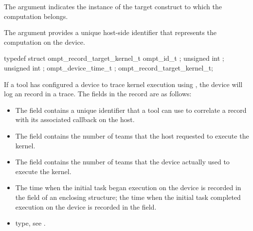 \constraints

The argument  indicates the instance of the
target construct to which the computation belongs.

The argument  provides a unique host-side
identifier that represents the computation on the device.

\record

\begin{ccppspecific}
\begin{omptRecord}
typedef struct ompt_record_target_kernel_t {
  ompt_id_t ;
  unsigned int ;
  unsigned int ;
  ompt_device_time_t ;
} ompt_record_target_kernel_t;
\end{omptRecord}
\end{ccppspecific}



If a tool has configured a device to trace kernel execution using ,
the device will log an  record in a trace. The fields 
in the record
are as follows:

\begin{itemize}
\item The  field contains a unique identifier that a tool can use to correlate a
 record with its associated  callback
on the host.

\item The  field contains the number of teams that the host requested to execute the kernel.

\item The  field contains the number of teams that the device actually used to execute the kernel.

\item The time when the initial task began execution on the device is recorded in the  field of an enclosing
 structure; the time when the initial task completed execution on the device is recorded in the  field.
\end{itemize}

\crossreferences
\begin{itemize}
\item {} type, see
.
\end{itemize}


